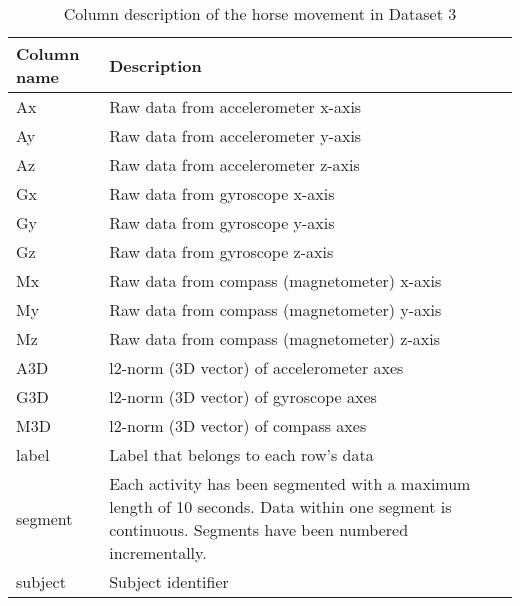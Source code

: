 \begin{table}[htb]
  \centering
  \caption{Column description of the horse movement in Dataset 3}
\begin{tabular}{lp{35em}}
\toprule
\multicolumn{1}{p{6.645em}}{\textbf{Column name}} & \textbf{Description}  \\
\midrule
Ax    & Raw data from accelerometer x-axis   \\
Ay    & Raw data from accelerometer y-axis \\
Az    & Raw data from accelerometer z-axis  \\
Gx    & Raw data from gyroscope x-axis  \\
Gy    & Raw data from gyroscope y-axis \\
Gz    & Raw data from gyroscope z-axis \\
Mx    & Raw data from compass (magnetometer) x-axis\\
My    & Raw data from compass (magnetometer) y-axis  \\
Mz    & Raw data from compass (magnetometer) z-axis \\
A3D   & l2-norm (3D vector) of accelerometer axes \\
G3D   & l2-norm (3D vector) of gyroscope axes\\
M3D   & l2-norm (3D vector) of compass axes  \\
label & Label that belongs to each row's data\\
segment & Each activity has been segmented with a maximum length of 10 seconds. Data within one segment is continuous. Segments have been numbered incrementally. \\
subject & Subject identifier \\
\bottomrule
\end{tabular}%

  \label{tab:horse_data_description}%
\end{table}%








